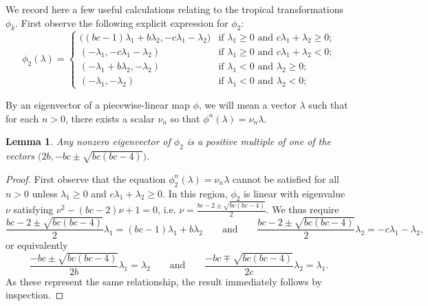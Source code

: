 \documentclass{amsart}
\newtheorem{lemma}[theorem]{Lemma}
\numberwithin{theorem}{section}
\begin{document}
  We record here a few useful calculations relating to the tropical transformations $\phi_k$.
  First observe the following explicit expression for $\phi_2$:
  \begin{equation}
    \label{eq:forward two step mutation}
    \phi_2(\lambda)
    =
    \begin{cases}
      \big((bc-1)\lambda_1+b\lambda_2, -c\lambda_1-\lambda_2\big) & \text{if $\lambda_1\ge 0$ and $c\lambda_1+\lambda_2\ge 0$;}\\
      (-\lambda_1, -c\lambda_1-\lambda_2) & \text{if $\lambda_1\ge 0$ and $c\lambda_1+\lambda_2<0$;}\\
      (-\lambda_1+b\lambda_2, -\lambda_2) & \text{if $\lambda_1<0$ and $\lambda_2\ge 0$;}\\
      (-\lambda_1,-\lambda_2) & \text{if $\lambda_1<0$ and $\lambda_2<0$;}
    \end{cases}
  \end{equation}

  By an eigenvector of a piecewise-linear map $\phi$, we will mean a vector $\lambda$ such that for each $n>0$, there exists a scalar $\nu_n$ so that $\phi^n(\lambda)=\nu_n\lambda$.
  \begin{lemma}
    Any nonzero eigenvector of $\phi_2$ is a positive multiple of one of the vectors $\big(2b,-bc\pm\sqrt{bc(bc-4)}\big)$.
  \end{lemma}
  \begin{proof}
    First observe that the equation $\phi_2^n(\lambda)=\nu_n\lambda$ cannot be satisfied for all $n>0$ unless $\lambda_1\ge 0$ and $c\lambda_1+\lambda_2\ge 0$.
    In this region, $\phi_2$ is linear with eigenvalue $\nu$ satisfying $\nu^2-(bc-2)\nu+1=0$, i.e. $\nu=\frac{bc-2\pm\sqrt{bc(bc-4)}}{2}$.
    We thus require 
    \[\frac{bc-2\pm\sqrt{bc(bc-4)}}{2}\lambda_1=(bc-1)\lambda_1+b\lambda_2 \qquad\text{and}\qquad \frac{bc-2\pm\sqrt{bc(bc-4)}}{2}\lambda_2= -c\lambda_1-\lambda_2,\]
    or equivalently
    \[\frac{-bc\pm\sqrt{bc(bc-4)}}{2b}\lambda_1=\lambda_2 \qquad\text{and}\qquad \frac{-bc\mp\sqrt{bc(bc-4)}}{2c}\lambda_2=\lambda_1.\]
    As these represent the same relationship, the result immediately follows by inspection.
  \end{proof}
\end{document}
